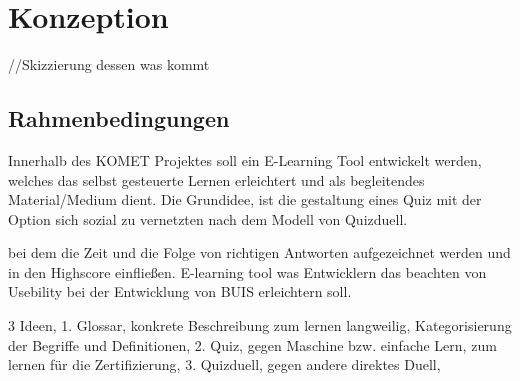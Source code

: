 \documentclass[a4paper, 12pt, twoside, BCOR=20mm, DIV=calc, abstracton, parskip=half*, toc=bibliography, toc=listof, headsepline, footsepline, headings=small, numbers=enddot]{scrreprt}
\begin{document}
	
	\chapter{Konzeption} //Skizzierung dessen was kommt 
	\section{Rahmenbedingungen}
	Innerhalb des KOMET Projektes soll ein E-Learning Tool entwickelt werden, welches das selbst gesteuerte Lernen erleichtert und als begleitendes Material/Medium dient. 
	Die Grundidee, ist die gestaltung eines Quiz mit der Option sich sozial zu vernetzten nach dem Modell von Quizduell. 
	
	 bei dem die Zeit und die Folge von richtigen Antworten aufgezeichnet werden und in den Highscore einfließen.
	E-learning tool was Entwicklern das beachten von Usebility bei der Entwicklung von BUIS erleichtern soll.  
	
	
	3 Ideen, 
	1. Glossar, konkrete Beschreibung zum lernen langweilig, Kategorisierung der Begriffe und Definitionen, 
	2. Quiz, gegen Maschine bzw. einfache Lern, zum lernen für die Zertifizierung,
	3. Quizduell, gegen andere direktes Duell, 
	
\end{document}
